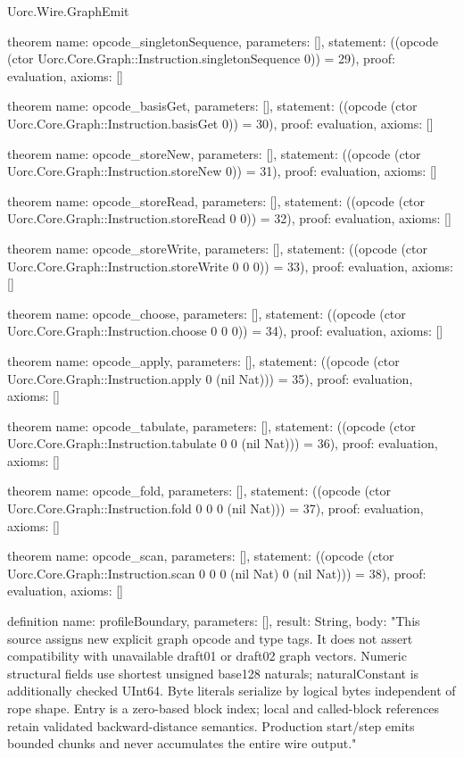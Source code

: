 \begin{lexlean}{Uorc.Wire.GraphEmit}
\begin{semanticmodule}
theorem{
  name: opcode_singletonSequence,
  parameters: [],
  statement: ((opcode (ctor Uorc.Core.Graph::Instruction.singletonSequence 0)) = 29),
  proof: evaluation{},
  axioms: []
}

theorem{
  name: opcode_basisGet,
  parameters: [],
  statement: ((opcode (ctor Uorc.Core.Graph::Instruction.basisGet 0)) = 30),
  proof: evaluation{},
  axioms: []
}

theorem{
  name: opcode_storeNew,
  parameters: [],
  statement: ((opcode (ctor Uorc.Core.Graph::Instruction.storeNew 0)) = 31),
  proof: evaluation{},
  axioms: []
}

theorem{
  name: opcode_storeRead,
  parameters: [],
  statement: ((opcode (ctor Uorc.Core.Graph::Instruction.storeRead 0 0)) = 32),
  proof: evaluation{},
  axioms: []
}

theorem{
  name: opcode_storeWrite,
  parameters: [],
  statement: ((opcode (ctor Uorc.Core.Graph::Instruction.storeWrite 0 0 0)) = 33),
  proof: evaluation{},
  axioms: []
}

theorem{
  name: opcode_choose,
  parameters: [],
  statement: ((opcode (ctor Uorc.Core.Graph::Instruction.choose 0 0 0)) = 34),
  proof: evaluation{},
  axioms: []
}

theorem{
  name: opcode_apply,
  parameters: [],
  statement: ((opcode (ctor Uorc.Core.Graph::Instruction.apply 0 (nil Nat))) = 35),
  proof: evaluation{},
  axioms: []
}

theorem{
  name: opcode_tabulate,
  parameters: [],
  statement: ((opcode (ctor Uorc.Core.Graph::Instruction.tabulate 0 0 (nil Nat))) = 36),
  proof: evaluation{},
  axioms: []
}

theorem{
  name: opcode_fold,
  parameters: [],
  statement: ((opcode (ctor Uorc.Core.Graph::Instruction.fold 0 0 0 (nil Nat))) = 37),
  proof: evaluation{},
  axioms: []
}

theorem{
  name: opcode_scan,
  parameters: [],
  statement: ((opcode (ctor Uorc.Core.Graph::Instruction.scan 0 0 0 (nil Nat) 0 (nil Nat))) = 38),
  proof: evaluation{},
  axioms: []
}

definition{
  name: profileBoundary,
  parameters: [],
  result: String,
  body: "This source assigns new explicit graph opcode and type tags. It does not assert compatibility with unavailable draft01 or draft02 graph vectors. Numeric structural fields use shortest unsigned base128 naturals; naturalConstant is additionally checked UInt64. Byte literals serialize by logical bytes independent of rope shape. Entry is a zero-based block index; local and called-block references retain validated backward-distance semantics. Production start/step emits bounded chunks and never accumulates the entire wire output."
}
\end{semanticmodule}
\end{lexlean}
